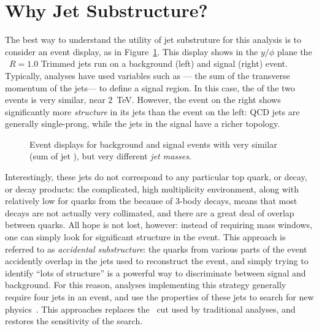
\section{Why Jet Substructure?}

The best way to understand the utility of jet substruture for this analysis is to consider an event display, as in Figure~\ref{fig:search:motivation:event-displays}. This display shows in the $y/\phi$ plane the \antikt\ $R=1.0$ Trimmed jets run on a background (left) and signal (right) event. Typically, analyses have used variables such as \Ht--- the sum of the transverse momentum of the jets--- to define a signal region. In this case, the \Ht of the two events is very similar, near $2$~TeV. However, the event on the right shows significantly more \textit{structure} in its jets than the event on the left: QCD jets are generally single-prong, while the jets in the signal have a richer topology.  


\begin{figure}
\centering
{}
\caption{Event displays for background and signal events with very similar \Ht (sum of jet \pt), but very different \textit{jet masses}.}
\label{fig:search:motivation:event-displays}
\end{figure}


Interestingly, these \largeR jets do not correspond to any particular top quark, or \lsp decay, or \gl decay products: the complicated, high multiplicity environment, along with relatively low \pt for quarks from the \lsp because of 3-body decays, means that most decays are not actually very collimated, and there are a great deal of overlap between quarks. All hope is not lost, however: instead of requiring mass windows, one can simply look for significant structure in the event. This approach is referred to as \textit{accidental substructure}: the quarks from various parts of the event accidently overlap in the \largeR jets used to reconstruct the event, and simply trying to identify ``lots of structure'' is a powerful way to discriminate between signal and background. For this reason, analyses implementing this strategy generally require four \largeR jets in an event, and use the properties of these jets to search for new physics~\cite{Hook:2012fd,Cohen:2012yc}. This approaches replaces the \met~cut used by traditional analyses, and restores the sensitivity of the search.

